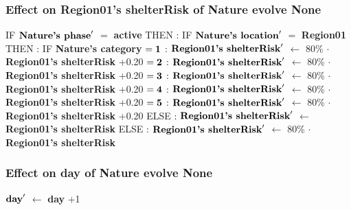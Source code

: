 \documentclass{article}%
\begin{document}
\subsubsection{Effect on Region01's shelterRisk of Nature evolve None}%
\label{ssubsec:Effect on Region01's shelterRisk of Nature evolve None}%
\begin{flushleft}%
IF %
$\mbox{\textbf{Nature's phase}} '$%
$=$%
\textbf{active}%
\linebreak%
\hspace*{2em}%
THEN %
: %
IF %
$\mbox{\textbf{Nature's location}} '$%
$=$%
\textbf{Region01}%
\linebreak%
\hspace*{4em}%
THEN %
: %
IF %
\textbf{Nature's category}%
\linebreak%
\hspace*{6em}%
$= \mbox{\textbf{1}}$%
: %
$\mbox{\textbf{Region01's shelterRisk}} '$%
$\leftarrow$%
80\%%
$\cdot$%
\textbf{Region01's shelterRisk}%
+0.20%
\linebreak%
\hspace*{6em}%
$= \mbox{\textbf{2}}$%
: %
$\mbox{\textbf{Region01's shelterRisk}} '$%
$\leftarrow$%
80\%%
$\cdot$%
\textbf{Region01's shelterRisk}%
+0.20%
\linebreak%
\hspace*{6em}%
$= \mbox{\textbf{3}}$%
: %
$\mbox{\textbf{Region01's shelterRisk}} '$%
$\leftarrow$%
80\%%
$\cdot$%
\textbf{Region01's shelterRisk}%
+0.20%
\linebreak%
\hspace*{6em}%
$= \mbox{\textbf{4}}$%
: %
$\mbox{\textbf{Region01's shelterRisk}} '$%
$\leftarrow$%
80\%%
$\cdot$%
\textbf{Region01's shelterRisk}%
+0.20%
\linebreak%
\hspace*{6em}%
$= \mbox{\textbf{5}}$%
: %
$\mbox{\textbf{Region01's shelterRisk}} '$%
$\leftarrow$%
80\%%
$\cdot$%
\textbf{Region01's shelterRisk}%
+0.20%
\linebreak%
\hspace*{4em}%
ELSE %
: %
$\mbox{\textbf{Region01's shelterRisk}} '$%
$\leftarrow$%
\textbf{Region01's shelterRisk}%
\linebreak%
\hspace*{2em}%
ELSE %
: %
$\mbox{\textbf{Region01's shelterRisk}} '$%
$\leftarrow$%
80\%%
$\cdot$%
\textbf{Region01's shelterRisk}%
\end{flushleft}

%
\subsubsection{Effect on day of Nature evolve None}%
\label{ssubsec:Effect on day of Nature evolve None}%
\begin{flushleft}%
$\mbox{\textbf{day}} '$%
$\leftarrow$%
\textbf{day}%
+1%
\end{flushleft}
\end{document}
